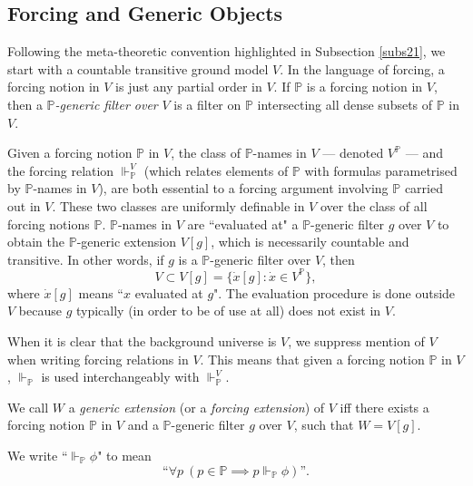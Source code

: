 \documentclass[12pt]{article}
\numberwithin{equation}{section}
\begin{document}
\subsection{Forcing and Generic Objects}\label{subs24}

Following the meta-theoretic convention highlighted in Subsection \ref{subs21}, we start with a countable transitive ground model $V$. In the language of forcing, a forcing notion in $V$ is just any partial order in $V$. If $\mathbb{P}$ is a forcing notion in $V$, then a $\mathbb{P}$\emph{-generic filter over} $V$ is a filter on $\mathbb{P}$ intersecting all dense subsets of $\mathbb{P}$ in $V$. 

Given a forcing notion $\mathbb{P}$ in $V$, the class of $\mathbb{P}$-names in $V$ --- denoted $V^{\mathbb{P}}$ --- and the forcing relation $\Vdash_{\mathbb{P}}^V$ (which relates elements of $\mathbb{P}$ with formulas parametrised by $\mathbb{P}$-names in $V$), are both essential to a forcing argument involving $\mathbb{P}$ carried out in $V$. These two classes are uniformly definable in $V$ over the class of all forcing notions $\mathbb{P}$. $\mathbb{P}$-names in $V$ are ``evaluated at" a $\mathbb{P}$-generic filter $g$ over $V$ to obtain the $\mathbb{P}$-generic extension $V[g]$, which is necessarily countable and transitive. In other words, if $g$ is a $\mathbb{P}$-generic filter over $V$, then
\begin{equation*}
    V \subset V[g] = \{\dot{x}[g] : \dot{x} \in V^{\mathbb{P}}\},
\end{equation*}
where $\dot{x}[g]$ means ``$x$ evaluated at $g$". The evaluation procedure is done outside $V$ because $g$ typically (in order to be of use at all) does not exist in $V$. 

\begin{con}
When it is clear that the background universe is $V$, we suppress mention of $V$ when writing forcing relations in $V$. This means that given a forcing notion $\mathbb{P}$ in $V$, $\Vdash_{\mathbb{P}}$ is used interchangeably with $\Vdash_{\mathbb{P}}^V$.
\end{con}

\begin{defi}
We call $W$ a \emph{generic extension} (or a \emph{forcing extension}) of $V$ iff there exists a forcing notion $\mathbb{P}$ in $V$ and a $\mathbb{P}$-generic filter $g$ over $V$, such that $W = V[g]$.
\end{defi}

\begin{defi}
We write ``$\Vdash_{\mathbb{P}} \phi$" to mean $$\text{``} \forall p \ (p \in \mathbb{P} \implies p \Vdash_{\mathbb{P}} \phi) \text{''.}$$ 
\end{defi}
\end{document}
